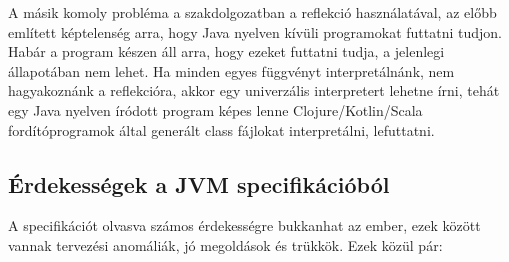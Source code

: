 A másik komoly probléma a szakdolgozatban a reflekció használatával, az előbb említett képtelenség arra, hogy Java nyelven kívüli programokat futtatni tudjon. Habár a program készen áll arra, hogy ezeket futtatni tudja, a jelenlegi állapotában nem lehet. Ha minden egyes függvényt interpretálnánk, nem hagyakoznánk a reflekcióra, akkor egy univerzális interpretert lehetne írni, tehát egy Java nyelven íródott program képes lenne Clojure/Kotlin/Scala fordítóprogramok által generált class fájlokat interpretálni, lefuttatni.

\subsection{Érdekességek a JVM specifikációból}

A specifikációt olvasva számos érdekességre bukkanhat az ember, ezek között vannak tervezési anomáliák, jó megoldások és trükkök. Ezek közül pár:

